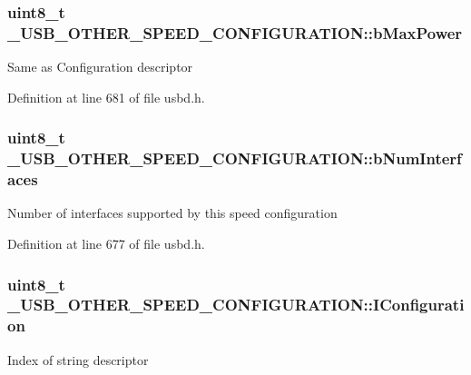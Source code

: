 \subsubsection[{\texorpdfstring{b\+Max\+Power}{bMaxPower}}]{\setlength{\rightskip}{0pt plus 5cm}uint8\+\_\+t \+\_\+\+U\+S\+B\+\_\+\+O\+T\+H\+E\+R\+\_\+\+S\+P\+E\+E\+D\+\_\+\+C\+O\+N\+F\+I\+G\+U\+R\+A\+T\+I\+O\+N\+::b\+Max\+Power}\hypertarget{struct__USB__OTHER__SPEED__CONFIGURATION_a3764f1ba43fd9b053b8e4675e306ff5b}{}\label{struct__USB__OTHER__SPEED__CONFIGURATION_a3764f1ba43fd9b053b8e4675e306ff5b}
Same as Configuration descriptor 

Definition at line 681 of file usbd.\+h.

\subsubsection[{\texorpdfstring{b\+Num\+Interfaces}{bNumInterfaces}}]{\setlength{\rightskip}{0pt plus 5cm}uint8\+\_\+t \+\_\+\+U\+S\+B\+\_\+\+O\+T\+H\+E\+R\+\_\+\+S\+P\+E\+E\+D\+\_\+\+C\+O\+N\+F\+I\+G\+U\+R\+A\+T\+I\+O\+N\+::b\+Num\+Interfaces}\hypertarget{struct__USB__OTHER__SPEED__CONFIGURATION_a7ebb3afc825c1940c5ff1c5b2907ac38}{}\label{struct__USB__OTHER__SPEED__CONFIGURATION_a7ebb3afc825c1940c5ff1c5b2907ac38}
Number of interfaces supported by this speed configuration 

Definition at line 677 of file usbd.\+h.

\subsubsection[{\texorpdfstring{I\+Configuration}{IConfiguration}}]{\setlength{\rightskip}{0pt plus 5cm}uint8\+\_\+t \+\_\+\+U\+S\+B\+\_\+\+O\+T\+H\+E\+R\+\_\+\+S\+P\+E\+E\+D\+\_\+\+C\+O\+N\+F\+I\+G\+U\+R\+A\+T\+I\+O\+N\+::\+I\+Configuration}\hypertarget{struct__USB__OTHER__SPEED__CONFIGURATION_a69e71d4b33b56469a4388c07e811e390}{}\label{struct__USB__OTHER__SPEED__CONFIGURATION_a69e71d4b33b56469a4388c07e811e390}
Index of string descriptor 

